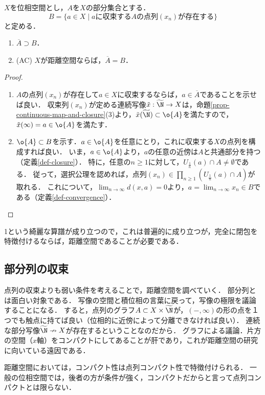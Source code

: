 \documentclass[uplatex,dvipdfmx]{jsreport}
\newcommand{\wN}{\widetilde{\N}}
\renewcommand{\x}{\tilde{x}}
\begin{document}
\begin{corollary}[点列による閉包の特徴付け]\label{cor-characterization-of-closure-in-terms-of-limits}
    $X$を位相空間とし，$A$を$X$の部分集合とする．
    \[ B=\{a\in X\mid aに収束するAの点列(x_n)が存在する\} \]
    と定める．
    \begin{enumerate}
        \item $\overline{A}\supset B$．
        \item (AC) $X$が距離空間ならば，$\overline{A}=B$．
    \end{enumerate}
\end{corollary}
\begin{proof}\mbox{}
    \begin{enumerate}
        \item $A$の点列$(x_n)$が存在して$a\in X$に収束するならば，$a\in\overline{A}$であることを示せば良い．
        収束列$(x_n)$が定める連続写像$\tilde{x}:\wN\to X$は，命題\ref{prop-continuous-map-and-closure}(3)より，$\tilde{x}(\wN)\subset\o{A}$を満たすので，$\x(\infty)=a\in\o{A}$を満たす．
        \item 
        $\o{A}\subset B$を示す．$a\in\o{A}$を任意にとり，これに収束する$X$の点列を構成すれば良い．
        いま，$a\in\o{A}$より，$a$の任意の近傍は$A$と共通部分を持つ（定義\ref{def-closure}）．
        特に，任意の$n\ge 1$に対して，$U_{\frac{1}{n}}(a)\cap A\ne\emptyset$である．
        従って，選択公理を認めれば，点列$(x_n)\in\prod_{n\ge 1}(U_{\frac{1}{n}}(a)\cap A)$が取れる．
        これについて，$\lim_{n\to\infty}d(x,a)=0$より，$a=\lim_{n\to\infty}x_n\in B$である（定義\ref{def-convergence}）．
    \end{enumerate}
\end{proof}
\begin{remarks}
    1という綺麗な算譜が成り立つので，これは普遍的に成り立つが，完全に閉包を特徴付けるならば，距離空間であることが必要である．
\end{remarks}

\subsection{部分列の収束}

\begin{tcolorbox}[colframe=ForestGreen, colback=ForestGreen!10!white, breakable ,colbacktitle=ForestGreen!40!white, coltitle=black,fonttitle=\bfseries\sffamily
    ,title=部分列という武器：積位相で議論する美しさ]
    点列の収束よりも弱い条件を考えることで，距離空間を調べていく．
    部分列とは面白い対象である．
    写像の空間と積位相の言葉に戻って，写像の極限を議論することになる．
    すると，点列のグラフ$A\subset X\times\wN$が，$(-,\infty)$の形の点を１つでも触点に持てば良い（位相的に近傍によって分離できなければ良い）．
    連続な部分写像$\wN\nrightarrow X$が存在するということなのだから．
    グラフによる議論．片方の空間（$x$軸）をコンパクトにしてあることが肝であり，これが距離空間の研究に向いている遠因である．

    距離空間においては，コンパクト性は点列コンパクト性で特徴付けられる．
    一般の位相空間では，後者の方が条件が強く，コンパクトだからと言って点列コンパクトとは限らない．
\end{tcolorbox}
\end{document}
